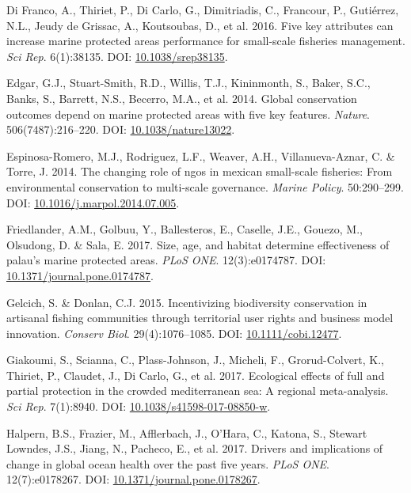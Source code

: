 \documentclass[12pt,]{article}
\begin{document}
\hypertarget{ref-difranco_2016-Xw}{}
Di Franco, A., Thiriet, P., Di Carlo, G., Dimitriadis, C., Francour, P.,
Gutiérrez, N.L., Jeudy de Grissac, A., Koutsoubas, D., et al. 2016. Five
key attributes can increase marine protected areas performance for
small-scale fisheries management. \emph{Sci Rep}. 6(1):38135. DOI:
\href{https://doi.org/10.1038/srep38135}{10.1038/srep38135}.

\hypertarget{ref-edgar_2014-UO}{}
Edgar, G.J., Stuart-Smith, R.D., Willis, T.J., Kininmonth, S., Baker,
S.C., Banks, S., Barrett, N.S., Becerro, M.A., et al. 2014. Global
conservation outcomes depend on marine protected areas with five key
features. \emph{Nature}. 506(7487):216--220. DOI:
\href{https://doi.org/10.1038/nature13022}{10.1038/nature13022}.

\hypertarget{ref-espinosaromero_2014-PY}{}
Espinosa-Romero, M.J., Rodriguez, L.F., Weaver, A.H., Villanueva-Aznar,
C. \& Torre, J. 2014. The changing role of ngos in mexican small-scale
fisheries: From environmental conservation to multi-scale governance.
\emph{Marine Policy}. 50:290--299. DOI:
\href{https://doi.org/10.1016/j.marpol.2014.07.005}{10.1016/j.marpol.2014.07.005}.

\hypertarget{ref-friedlander_2017-oI}{}
Friedlander, A.M., Golbuu, Y., Ballesteros, E., Caselle, J.E., Gouezo,
M., Olsudong, D. \& Sala, E. 2017. Size, age, and habitat determine
effectiveness of palau's marine protected areas. \emph{PLoS ONE}.
12(3):e0174787. DOI:
\href{https://doi.org/10.1371/journal.pone.0174787}{10.1371/journal.pone.0174787}.

\hypertarget{ref-gelcich_2015-Gw}{}
Gelcich, S. \& Donlan, C.J. 2015. Incentivizing biodiversity
conservation in artisanal fishing communities through territorial user
rights and business model innovation. \emph{Conserv Biol}.
29(4):1076--1085. DOI:
\href{https://doi.org/10.1111/cobi.12477}{10.1111/cobi.12477}.

\hypertarget{ref-giakoumi_2017-V2}{}
Giakoumi, S., Scianna, C., Plass-Johnson, J., Micheli, F.,
Grorud-Colvert, K., Thiriet, P., Claudet, J., Di Carlo, G., et al. 2017.
Ecological effects of full and partial protection in the crowded
mediterranean sea: A regional meta-analysis. \emph{Sci Rep}. 7(1):8940.
DOI:
\href{https://doi.org/10.1038/s41598-017-08850-w}{10.1038/s41598-017-08850-w}.

\hypertarget{ref-halpern_2017-Zi}{}
Halpern, B.S., Frazier, M., Afflerbach, J., O'Hara, C., Katona, S.,
Stewart Lowndes, J.S., Jiang, N., Pacheco, E., et al. 2017. Drivers and
implications of change in global ocean health over the past five years.
\emph{PLoS ONE}. 12(7):e0178267. DOI:
\href{https://doi.org/10.1371/journal.pone.0178267}{10.1371/journal.pone.0178267}.
\end{document}
